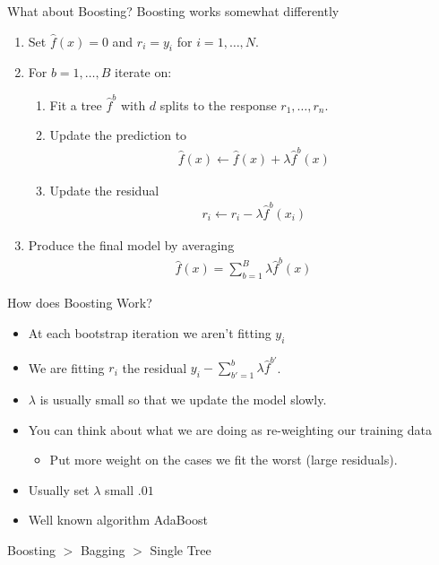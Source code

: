 \documentclass[xcolor=pdftex,dvipsnames,table,mathserif,aspectratio=169]{beamer}
\begin{document}
\begin{frame}{What about Boosting?}
\alert{Boosting} works somewhat differently
\begin{enumerate}
\item Set $\hat{f}(x) = 0$ and $r_i = y_i$ for $i=1,\ldots, N$.
\item For $b=1,\ldots,B$ iterate on:
\begin{enumerate}
\item Fit a tree $\hat{f}^b$ with $d$ splits to the response $r_1,\ldots, r_n$.
\item Update the prediction to
\begin{align*}
\hat{f}(x) \leftarrow \hat{f}(x)+\lambda \hat{f}^{b}(x)
\end{align*}
\item Update the residual
\begin{align*}
r_{i} \leftarrow r_{i}-\lambda \hat{f}^{b}\left(x_{i}\right)
\end{align*}
\end{enumerate}
\item Produce the final model by averaging
\begin{align*}
\hat{f}(x)=\sum_{b=1}^{B} \lambda \hat{f}^{b}(x)
\end{align*}
\end{enumerate}
\end{frame}


\begin{frame}{How does Boosting Work?}
\begin{itemize}
\item At each bootstrap iteration we aren't fitting $y_i$
\item We are fitting $r_i$ the residual $y_i - \sum_{b'=1}^{b} \lambda \hat{f}^{b'}$. 
\item $\lambda$ is usually small so that we update the model \alert{slowly}.
\item You can think about what we are doing as \alert{re-weighting our training data}
\begin{itemize}
\item Put more weight on the cases we fit the worst (large residuals).
\end{itemize}
\item Usually set $\lambda$ small $.01$
\item Well known algorithm \alert{AdaBoost}
\end{itemize}
Boosting $>$ Bagging $>$ Single Tree
\end{frame}
\end{document}
